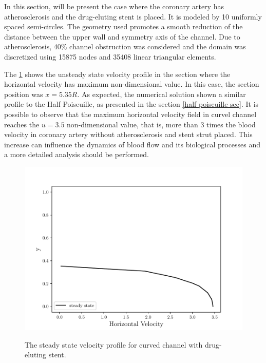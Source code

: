 In this section, will be present
the case where the coronary 
artery has atherosclerosis and 
the drug-eluting stent is placed. 
It is modeled by 10 uniformly spaced 
semi-circles. 
The geometry used promotes a smooth reduction of the 
distance between the upper wall and symmetry axis of the channel. 
Due to atherosclerosis, 40\% channel obstruction was considered 
and the domain was discretized using 15875 nodes and 35408 
linear triangular elements. 

\medskip 
The \ref{velocity evolution curved stent} shows the unsteady state 
velocity profile in the section where the horizontal 
velocity has maximum non-dimensional value.
In this case, the section position was $x=5.35R$. 
As expected, the numerical solution shown a similar profile to
the Half Poiseuille, as presented in the section \ref{half poiseuille sec}.
It is possible to observe that the maximum horizontal velocity field 
in curvel channel reaches the $u=3.5$ non-dimensional value, that is, 
more than 3 times the blood velocity in coronary artery
without atherosclerosis and stent strut placed. 
This increase can influence the dynamics of blood flow
and its biological processes and a more detailed analysis
should be performed.

\begin{figure}[H]
     \centering
     \includegraphics[scale=1]{./02_chaps/cap_solution/figure/vel_CurvedStrut_evol.pdf}\\
     \caption{
The steady state velocity profile for curved channel with drug-eluting stent.}
     \label{velocity evolution curved stent}
\end{figure}

